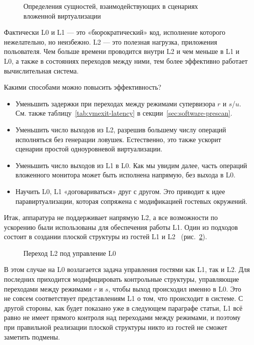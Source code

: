 \begin{figure}[htb]
    \centering
    \caption[Сценарий вложенной виртуализации]{Определения сущностей, взаимодействующих в сценариях вложенной виртуализации}
    \label{fig:nested-virt}
\end{figure}

Фактически L0 и L1 — это «бюрократический» код, исполнение которого нежелательно, но неизбежно. L2 — это полезная нагрузка, приложения польователя. Чем больше времени проводится внутри L2 и чем меньше в L1 и L0, а также в состояниях переходов между ними, тем более эффективно работает вычислительная система.

Какими способами можно повысить эффективность?

\begin{itemize}
\item Уменьшить задержки при переходах между режимами супервизора $r$ и $s$/$u$. См. также таблицу~\ref{tab:vmexit-latency} в секции~\ref{sec:software-prescan}.
\item Уменьшить число выходов из L2, разрешив большему числу операций исполняться без генерации ловушек. Естественно, это также ускорит сценарии простой одноуровневой виртуализации.
\item Уменьшить число выходов из L1 в L0. Как мы увидим далее, часть операций вложенного монитора может быть исполнена напрямую, без выхода в L0.
\item Научить L0, L1 «договариваться» друг с другом. Это приводит к идее паравиртуализации, которая сопряжена с модификацией гостевых окружений.
\end{itemize}

Итак, аппаратура не поддерживает напрямую L2, а все возможности по ускорению были использованы для обеспечения работы L1. Один из подходов состоит в создании плоской структуры из гостей L1 и L2~\cite{turtles} (рис.~\ref{fig:nested-virt-flat}).

\begin{figure}[htb]
    \centering
    \caption[Переход L2 под управление L0]{Переход L2 под управление L0}
    \label{fig:nested-virt-flat}
\end{figure}

В этом случае на L0 возлагается задача управления гостями как L1, так и L2. Для последних приходится модифицировать контрольные структуры, управляющие переходами между режимами $r$ и $s$, чтобы выход происходил именно в L0. Это не совсем соответствует представлениям L1 о том, что происходит в системе. С другой стороны, как будет показано уже в следующем параграфе статьи, L1 всё равно не имеет прямого контроля над переходами между режимами, и поэтому при правильной реализации плоской структуры никто из гостей не сможет заметить подмены.

